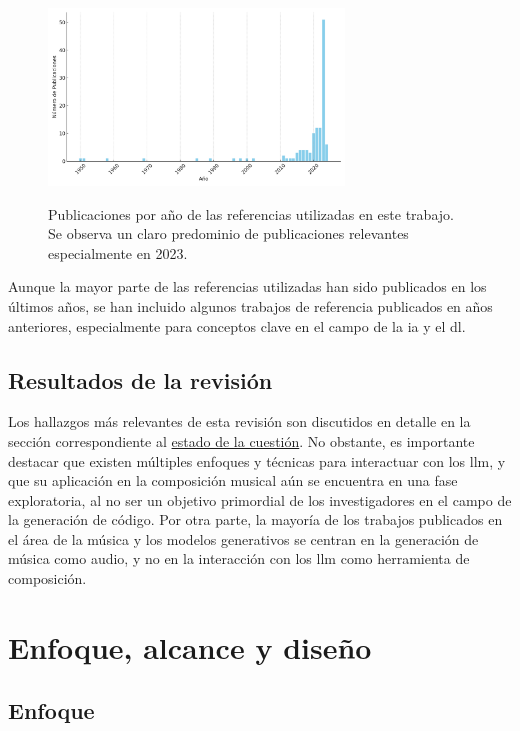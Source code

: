\begin{figure}[h]
    \caption[Publicaciones por año de las referencias utilizadas]{Publicaciones por año de las referencias utilizadas en este trabajo. Se observa un claro predominio de publicaciones relevantes especialmente en 2023.}
    \centering
    \includegraphics[width=0.7\textwidth]{./figuras/publications_per_year_referencias.png}
    \source{\propio}
    \label{fig:publications_per_year_referencias}
\end{figure}

Aunque la mayor parte de las referencias utilizadas han sido publicados en los últimos años, se han incluido algunos trabajos de referencia publicados en años anteriores, especialmente para conceptos clave en el campo de la \gls{ia} y el \gls{dl}.

\subsection{Resultados de la revisión}
Los hallazgos más relevantes de esta revisión son discutidos en detalle en la sección correspondiente al \hyperref[chap:estado_cuestion]{estado de la cuestión}. No obstante, es importante destacar que existen múltiples enfoques y técnicas para interactuar con los \gls{llm}, y que su aplicación en la composición musical aún se encuentra en una fase exploratoria, al no ser un objetivo primordial de los investigadores en el campo de la generación de código. Por otra parte, la mayoría de los trabajos publicados en el área de la música y los modelos generativos se centran en la generación de música como audio, y no en la interacción con los \gls{llm} como herramienta de composición. 

\section{Enfoque, alcance y diseño}

\subsection{Enfoque}

